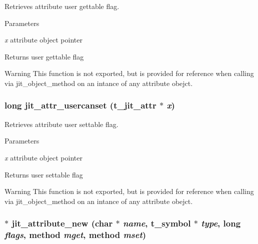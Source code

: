 Retrieves attribute user gettable flag. 
\begin{DoxyParams}{Parameters}
\item[{\em x}]attribute object pointer\end{DoxyParams}
\begin{DoxyReturn}{Returns}
user gettable flag
\end{DoxyReturn}
\begin{DoxyWarning}{Warning}
This function is not exported, but is provided for reference when calling via jit\_\-object\_\-method on an intance of any attribute obejct. 
\end{DoxyWarning}
\hypertarget{group__attrmod_ga89141c07259e2b3a568b7879874a20be}{
\subsubsection[{jit\_\-attr\_\-usercanset}]{\setlength{\rightskip}{0pt plus 5cm}long jit\_\-attr\_\-usercanset ({\bf t\_\-jit\_\-attr} $\ast$ {\em x})}}
\label{group__attrmod_ga89141c07259e2b3a568b7879874a20be}


Retrieves attribute user settable flag. 
\begin{DoxyParams}{Parameters}
\item[{\em x}]attribute object pointer\end{DoxyParams}
\begin{DoxyReturn}{Returns}
user settable flag
\end{DoxyReturn}
\begin{DoxyWarning}{Warning}
This function is not exported, but is provided for reference when calling via jit\_\-object\_\-method on an intance of any attribute obejct. 
\end{DoxyWarning}
\hypertarget{group__attrmod_ga1f1e9ce77ed7e385a52f3c91fcd0b348}{
\subsubsection[{jit\_\-attribute\_\-new}]{ $\ast$ jit\_\-attribute\_\-new (char $\ast$ {\em name}, \/  {\bf t\_\-symbol} $\ast$ {\em type}, \/  long {\em flags}, \/  {\bf method} {\em mget}, \/  {\bf method} {\em mset})}}
\label{group__attrmod_ga1f1e9ce77ed7e385a52f3c91fcd0b348}


